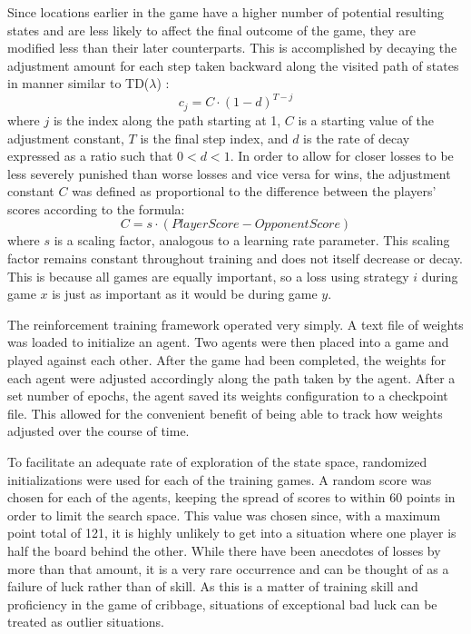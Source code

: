 Since locations earlier in the game have a higher number of potential resulting
states and are less likely to affect the final outcome of the game,
they are modified less than their later counterparts.
%
This is accomplished by decaying the adjustment amount for each step taken
backward along the visited path of states in manner similar to TD($\lambda$)
\cite{tdgammon}:
\[
	c_j = C \cdot (1 - d)^{T-j}
\]
where $j$ is the index along the path starting at 1,
$C$ is a starting value of the adjustment constant,
$T$ is the final step index,
and $d$ is the rate of decay expressed as a ratio such that $0 < d < 1$.
%
In order to allow for closer losses to be less severely punished than worse
losses and vice versa for wins,
the adjustment constant $C$ was defined as proportional to the difference
between the players' scores according to the formula:
\[
	C = s \cdot \left({PlayerScore} - {OpponentScore}\right) 
\]
where $s$ is a scaling factor,
analogous to a learning rate parameter.
%
This scaling factor remains constant throughout training
and does not itself decrease or decay.
%
This is because all games are equally important,
so a loss using strategy $i$ during game $x$ is just as important as
it would be during game $y$.

The reinforcement training framework operated very simply.
%
A text file of weights was loaded to initialize an agent.
%
Two agents were then placed into a game and played against each other.
%
After the game had been completed,
the weights for each agent were adjusted
accordingly along the path taken by the agent.
%
After a set number of epochs, the agent saved its weights configuration to a
checkpoint file.
%
This allowed for the convenient benefit of being able to track how weights
adjusted over the course of time.

To facilitate an adequate rate of exploration of the state space,
randomized initializations were used for each of the training games.
%
A random score was chosen for each of the agents,
keeping the spread of scores to within 60 points
in order to limit the search space.
%
This value was chosen since,
with a maximum point total of 121,
it is highly unlikely to get into a situation where one player is half the board
behind the other.
%
While there have been anecdotes of losses by more than that amount,
it is a very rare occurrence and can be thought of as a failure of luck
rather than of skill.
%
As this is a matter of training skill and proficiency in the game of cribbage,
situations of exceptional bad luck can be treated as outlier situations.

